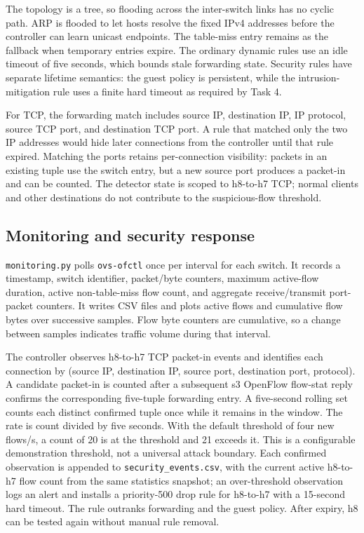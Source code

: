 \documentclass[conference]{IEEEtran}
\begin{document}
The topology is a tree, so flooding across the inter-switch links has no cyclic path. ARP is flooded to let hosts resolve the fixed IPv4 addresses before the controller can learn unicast endpoints. The table-miss entry remains as the fallback when temporary entries expire. The ordinary dynamic rules use an idle timeout of five seconds, which bounds stale forwarding state. Security rules have separate lifetime semantics: the guest policy is persistent, while the intrusion-mitigation rule uses a finite hard timeout as required by Task 4.

For TCP, the forwarding match includes source IP, destination IP, IP protocol, source TCP port, and destination TCP port. A rule that matched only the two IP addresses would hide later connections from the controller until that rule expired. Matching the ports retains per-connection visibility: packets in an existing tuple use the switch entry, but a new source port produces a packet-in and can be counted. The detector state is scoped to h8-to-h7 TCP; normal clients and other destinations do not contribute to the suspicious-flow threshold.

\subsection{Monitoring and security response}
\texttt{monitoring.py} polls \texttt{ovs-ofctl} once per interval for each switch. It records a timestamp, switch identifier, packet/byte counters, maximum active-flow duration, active non-table-miss flow count, and aggregate receive/transmit port-packet counters. It writes CSV files and plots active flows and cumulative flow bytes over successive samples. Flow byte counters are cumulative, so a change between samples indicates traffic volume during that interval.

The controller observes h8-to-h7 TCP packet-in events and identifies each connection by (source IP, destination IP, source port, destination port, protocol). A candidate packet-in is counted after a subsequent s3 OpenFlow flow-stat reply confirms the corresponding five-tuple forwarding entry. A five-second rolling set counts each distinct confirmed tuple once while it remains in the window. The rate is count divided by five seconds. With the default threshold of four new flows/s, a count of 20 is at the threshold and 21 exceeds it. This is a configurable demonstration threshold, not a universal attack boundary. Each confirmed observation is appended to \texttt{security\_events.csv}, with the current active h8-to-h7 flow count from the same statistics snapshot; an over-threshold observation logs an alert and installs a priority-500 drop rule for h8-to-h7 with a 15-second hard timeout. The rule outranks forwarding and the guest policy. After expiry, h8 can be tested again without manual rule removal.
\end{document}

